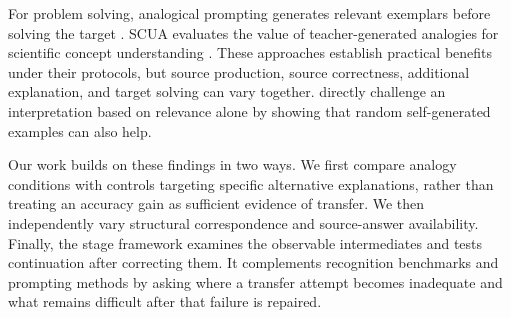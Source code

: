 For problem solving, analogical prompting generates relevant exemplars before solving the target \citep{yasunaga2024analogical}. SCUA evaluates the value of teacher-generated analogies for scientific concept understanding \citep{yuan2024boosting}. These approaches establish practical benefits under their protocols, but source production, source correctness, additional explanation, and target solving can vary together. \citet{qin2025relevant} directly challenge an interpretation based on relevance alone by showing that random self-generated examples can also help.

Our work builds on these findings in two ways. We first compare analogy conditions with controls targeting specific alternative explanations, rather than treating an accuracy gain as sufficient evidence of transfer. We then independently vary structural correspondence and source-answer availability. Finally, the stage framework examines the observable intermediates and tests continuation after correcting them. It complements recognition benchmarks and prompting methods by asking where a transfer attempt becomes inadequate and what remains difficult after that failure is repaired.
